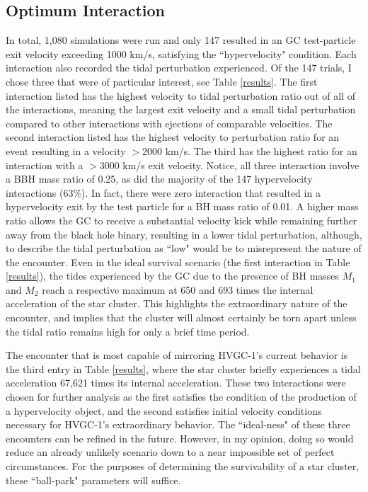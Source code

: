 \documentclass{aastex62}
\begin{document}
\subsection{Optimum Interaction}
In total, 1,080 simulations were run and only 147 resulted in an GC test-particle exit velocity exceeding 1000 km/s, satisfying the ``hypervelocity" condition. Each interaction also recorded the tidal perturbation experienced. Of the 147 trials, I chose three that were of particular interest, see Table \ref{results}. The first interaction listed has the highest velocity to tidal perturbation ratio out of all of the interactions, meaning the largest exit velocity and a small tidal perturbation compared to other interactions with ejections of comparable velocities. The second interaction listed has the highest velocity to perturbation ratio for an event resulting in a velocity $>$2000 km/s. The third has the highest ratio for an interaction with a $>$3000 km/s exit velocity. Notice, all three interaction involve a BBH mass ratio of 0.25, as did the majority of the 147 hypervelocity interactions (63$\%$). In fact, there were zero interaction that resulted in a hypervelocity exit by the test particle for a BH mass ratio of 0.01. A higher mass ratio allows the GC to receive a substantial velocity kick while remaining further away from the black hole binary, resulting in a lower tidal perturbation, although, to describe the tidal perturbation as ``low" would be to misrepresent the nature of the encounter. Even in the ideal survival scenario (the first interaction in Table \ref{results}), the tides experienced by the GC due to the presence of BH masses $M_{1}$ and $M_{2}$ reach a respective maximum at 650 and 693 times the internal acceleration of the star cluster. This highlights the extraordinary nature of the encounter, and implies that the cluster will almost certainly be torn apart unless the tidal ratio remains high for only a brief time period. 

The encounter that is most capable of mirroring HVGC-1's current behavior is the third entry in Table \ref{results}, where the star cluster briefly experiences a tidal acceleration 67,621 times its internal acceleration. These two interactions were chosen for further analysis as the first satisfies the condition of the production of a hypervelocity object, and the second satisfies initial velocity conditions necessary for HVGC-1's extraordinary behavior. The ``ideal-ness" of these three encounters can be refined in the future. However, in my opinion, doing so would reduce an already unlikely scenario down to a near impossible set of perfect circumstances. For the purposes of determining the survivability of a star cluster, these ``ball-park" parameters will suffice. 
\end{document}
